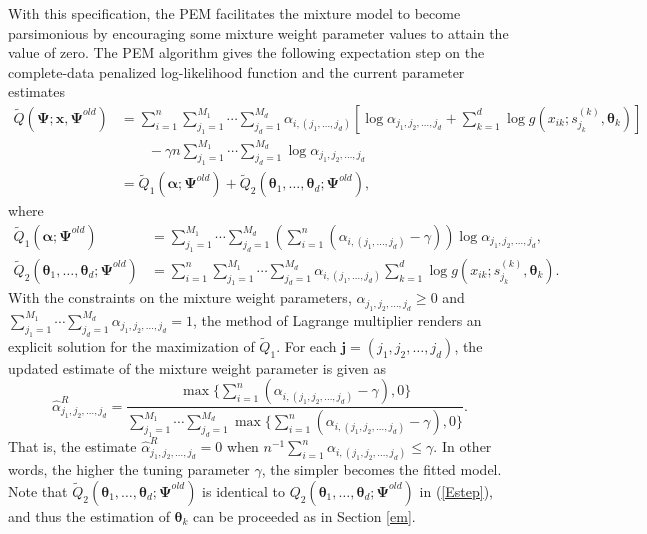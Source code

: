 \documentclass[eng]{csam}
\def\a{\alpha}
\begin{document}
With this specification, the PEM facilitates the mixture model to become parsimonious by encouraging some mixture weight parameter values to attain the value of zero. The PEM algorithm gives the following expectation step on the complete-data penalized log-likelihood function and the current parameter estimates
\begin{align}
\tilde{Q}(\bm{\Psi};\bm{x}, \bm{\Psi}^{old}) &= \sum_{i=1}^n \sum_{j_1 = 1}^{M_1} \cdots\sum_{j_d = 1}^{M_d} \a_{i,(j_1,\ldots,j_d)}\left[\log \a_{j_1,j_2,\ldots,j_d} + \sum_{k=1}^d \log g(x_{ik};s^{(k)}_{j_k}, \bm{\theta}_k)\right] \nonumber\\
&\qquad - \gamma n \sum_{j_1 = 1}^{M_1} \cdots\sum_{j_d = 1}^{M_d}\log \a_{j_1,j_2,\ldots,j_d} \nonumber\\
&= \tilde{Q}_1(\bm{\a};\bm{\Psi}^{old}) + \tilde{Q}_2(\bm{\theta}_1,\ldots, \bm{\theta}_d;\bm{\Psi}^{old}), \label{rEstep}
\end{align}
where
\begin{align*}
\tilde{Q}_1(\bm{\a};\bm{\Psi}^{old}) &= \sum_{j_1 = 1}^{M_1} \cdots\sum_{j_d = 1}^{M_d} \left(\sum_{i=1}^n (\a_{i,(j_1,\ldots,j_d)}-\gamma)\right) \log \a_{j_1,j_2,\ldots,j_d},\\
\tilde{Q}_2(\bm{\theta}_1,\ldots, \bm{\theta}_d;\bm{\Psi}^{old}) &= \sum_{i=1}^n \sum_{j_1 = 1}^{M_1} \cdots\sum_{j_d = 1}^{M_d} \a_{i,(j_1,\ldots,j_d)}\sum_{k=1}^d \log g(x_{ik};s^{(k)}_{j_k}, \bm{\theta}_k).
\end{align*}
With the constraints on the mixture weight parameters, $\a_{j_1,j_2,\ldots,j_d} \ge 0$ and $\sum_{j_1 = 1}^{M_1} \cdots\sum_{j_d = 1}^{M_d} \a_{j_1,j_2,\ldots,j_d} = 1$, the method of Lagrange multiplier renders an explicit solution for the maximization of $\tilde{Q}_1$. For each $\bm{j} = (j_1,j_2,\ldots,j_d)$, the updated estimate of the mixture weight parameter is given as
\begin{equation*}
\hat{\a}^{R}_{j_1,j_2,\ldots,j_d} = \frac{\max\{\sum_{i=1}^n \left(\a_{i,(j_1,j_2,\ldots,j_d)}-\gamma\right), 0\}}{\sum_{j_1 = 1}^{M_1} \cdots\sum_{j_d = 1}^{M_d} \max\{\sum_{i=1}^n \left(\a_{i,(j_1,j_2,\ldots,j_d)}-\gamma\right), 0\}}.
\end{equation*}
That is, the estimate $\hat{\a}^{R}_{j_1,j_2,\ldots,j_d} = 0$ when $n^{-1}\sum_{i=1}^n \a_{i,(j_1,j_2,\ldots,j_d)} \le \gamma$. In other words, the higher the tuning parameter $\gamma$, the simpler becomes the fitted model. Note that $\tilde{Q}_2(\bm{\theta}_1,\ldots, \bm{\theta}_d;\bm{\Psi}^{old})$ is identical to $Q_2(\bm{\theta}_1,\ldots, \bm{\theta}_d;\bm{\Psi}^{old})$ in (\ref{Estep}), and thus the estimation of $\bm{\theta}_k$ can be proceeded as in Section \ref{em}.
\end{document}
